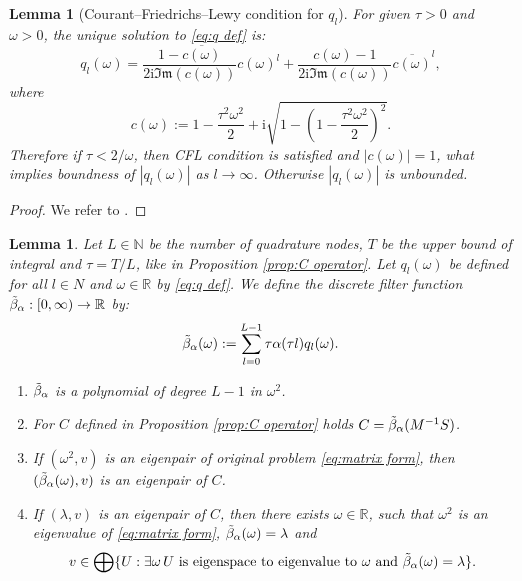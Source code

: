 \documentclass[a4paper,11pt,bibliography=totoc,listof=totoc,headinclude=true,cleardoublepage=empty,oneside]{scrbook}
\newtheorem{lemma}[theorem]{Lemma}
\newcommand{\R}{\mathbb{R}}
\newcommand{\N}{\mathbb{N}}
\renewcommand{\i}{\mathrm{i}}
\renewcommand{\Im}{\mathfrak{Im}}
\newcommand{\dff}{\Tilde{\beta}_\alpha}
\begin{document}
\begin{lemma}[Courant--Friedrichs--Lewy condition for $q_l$]\label{lemma:cfl}
    For given $\tau > 0$ and $\omega > 0$, the unique solution to \eqref{eq:q def} is:
    \begin{equation*}
        q_l(\omega) = \frac{1 - \overline{c(\omega)}}{2\i \Im(c(\omega))} c(\omega)^l + \frac{c(\omega)-1}{2\i \Im(c(\omega))} \overline{c(\omega)}^l,
    \end{equation*}
    where 
    \begin{equation*}
        c(\omega) := 1 - \frac{\tau^2 \omega^2}{2} + \i \sqrt{1 - \left(1 - \frac{\tau^2 \omega^2}{2}\right)^2}.
    \end{equation*}
    Therefore if $\tau < 2/\omega$, then CFL condition is satisfied and $|c(\omega)|=1$, what implies boundness of $|q_l(\omega)|$ as $l \rightarrow \infty$. Otherwise $|q_l(\omega)|$ is unbounded.
\end{lemma}
\begin{proof}
    We refer to \cite[p. 6]{nannen}.
\end{proof}
\begin{lemma}\label{lemma:dff}
    Let $L\in \N$ be the number of quadrature nodes, $T$ be the upper bound of integral and $\tau = T/L$, like in Proposition \ref{prop:C operator}. Let $q_l(\omega)$ be defined for all $l \in N$ and $\omega \in \R$ by \eqref{eq:q def}. We define the discrete filter function $\dff: [0, \infty) \rightarrow \R$ by:
    \begin{equation*}
        \dff(\omega) := \sum_{l=0}^{L-1} \tau \alpha(\tau l) q_l(\omega).
    \end{equation*}
    \begin{enumerate}
        \item $\dff$ is a polynomial of degree $L-1$ in $\omega^2$.
        \item For $C$ defined in Proposition \ref{prop:C operator} holds $C = \dff(M^{-1}S)$.
        \item If $(\omega^2, v)$ is an eigenpair of original problem \eqref{eq:matrix form}, then $(\dff(\omega), v)$ is an eigenpair of $C$.
        \item If $(\lambda, v)$ is an eigenpair of $C$, then there exists $\omega \in \R$, such that $\omega^2$ is an eigenvalue of \eqref{eq:matrix form}, $\dff(\omega)=\lambda$ and
        \begin{equation*}
            v \in \bigoplus\{ U : \exists \omega \, U \text{ is eigenspace to eigenvalue to } \omega \text{ and } \dff(\omega) = \lambda\}.
        \end{equation*}
    \end{enumerate}
\end{lemma}
\end{document}
